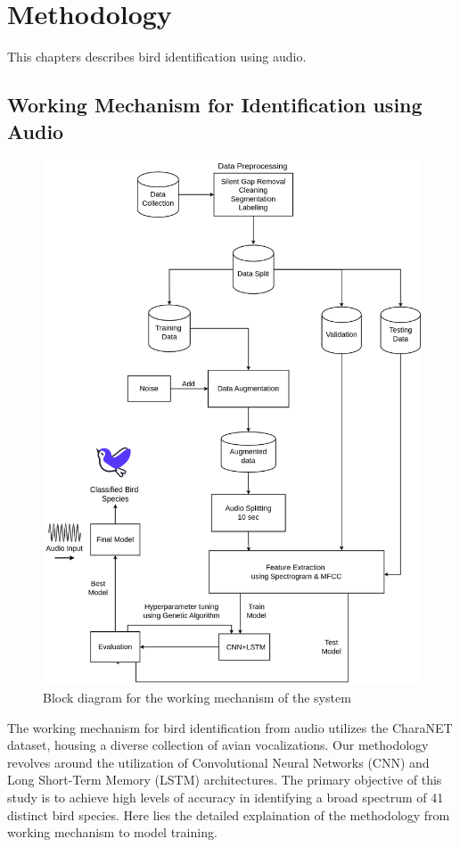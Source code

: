 \chapter{Methodology}
This chapters describes bird identification using audio.
\section{Working Mechanism for Identification using Audio}
\begin{figure}[h!]
    \centering
    \includegraphics[scale=0.33]{images/Methodology.png}
    \caption{Block diagram for the working mechanism of the
        system}%
\end{figure}
\newpage
The working mechanism for bird identification from audio utilizes the CharaNET
dataset,
housing a diverse collection of avian vocalizations. Our methodology revolves
around the
utilization of Convolutional Neural Networks (CNN) and Long Short-Term Memory
(LSTM) architectures.
The primary objective of this study is to achieve high levels of accuracy in
identifying a
broad spectrum of 41 distinct bird species. Here lies the detailed explaination
of the methodology
from working mechanism to model training.
